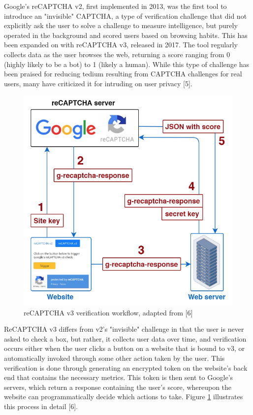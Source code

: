 \documentclass[sigplan,screen,nonacm]{acmart-tagged}
\begin{document}
Google's reCAPTCHA v2, first implemented in 2013, was the first tool to introduce an "invisible" CAPTCHA, a type of verification challenge that did not explicitly ask the user to solve a challenge to measure intelligence, but purely operated in the background and scored users based on browsing habits. This has been expanded on with reCAPTCHA v3, released in 2017. The tool regularly collects data as the user browses the web, returning a score ranging from 0 (highly likely to be a bot) to 1 (likely a human). While this type of challenge has been praised for reducing tedium resulting from CAPTCHA challenges for real users, many have criticized it for intruding on user privacy [5].  

\begin{figure}[h]
\centering
\includegraphics[width=0.7\linewidth]{resources/v3-workflow}
\caption{reCAPTCHA v3 verification workflow, adapted from [6]}
\label{fig:v3}
\end{figure}

ReCAPTCHA v3 differs from v2's "invisible" challenge in that the user is never asked to check a box, but rather, it collects user data over time, and verification occurs either when the user clicks a button on a website that is bound to v3, or automatically invoked through some other action taken by the user. This verification is done through generating an encrypted token on the website's back end that contains the necessary metrics. This token is then sent to Google's servers, which return a response containing the user's score, whereupon the website can programmatically decide which actions to take. Figure \ref{fig:v3} illustrates this process in detail [6].
\end{document}
